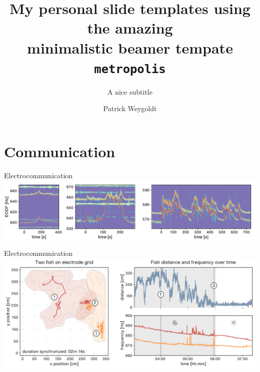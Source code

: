 \documentclass[10pt, aspectratio=169]{beamer}
\title{My personal slide templates using the amazing \\minimalistic beamer tempate \texttt{metropolis}}
\subtitle{A nice subtitle}
\author{Patrick Weygoldt}
\date{}
\begin{document}
\begin{frame}[standout]{}
\end{frame}

\begin{frame}[standout]{}
\end{frame}

\maketitle

\section{Communication}

\begin{frame}[fragile]{Electrocommunication}
    \includegraphics[width=\textwidth]{assets/selected_modulations.pdf}
\end{frame}

\begin{frame}[fragile]{Electrocommunication}
    \includegraphics[width=\textwidth]{assets/eventposition_2.pdf}
\end{frame}
\end{document}
